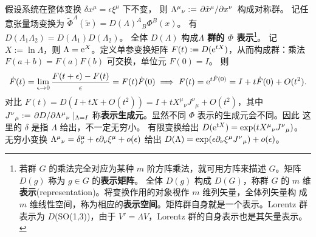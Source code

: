 假设系统在整体变换 $\delta x^\mu=\epsilon\xi^\mu$ 下不变，
则 $\Lambda^\mu{}_\nu:=\pdv*{\tilde x^\mu}{x^\nu}$ 构成对称群。
记任意张量场变换为 $\tilde\Phi^A(\tilde x) = D(\Lambda)^A{}_B\Phi^B(x)$。
有 $D(\Lambda_1\Lambda_2)=D(\Lambda_1)D(\Lambda_2)$。
全体 $D(\Lambda)$ 构成\textbf{$\Lambda$ 群的 $\Phi$ 表示}\footnote{若群 $G$ 的乘法完全对应为某种 $m$ 阶方阵乘法，就可用方阵来描述 $G$。矩阵 $D(g)$ 称为 $g\in G$ 的\textbf{表示矩阵}。
全体 $D(g)$ 构成 $D(G)$，称群 $G$ 的 $m$ 维\textbf{表示}(representation)。将变换作用的对象视作 $m$ 维列矢量，全体列矢量构
成 $m$ 维线性空间，称为相应的\textbf{表示空间}。矩阵群自身就是一个表示。Lorentz 群表示为 $D$(SO(1,3))，由于 $V'=\Lambda V$，Lorentz 群的自身表示也是其矢量表示。}。
记 $X:=\ln\Lambda$，则 $\Lambda=\mathrm{e}^X$。定义单参变换矩阵 $F(t):=D(\mathrm{e}^{tX})$，从而构成群：乘法 $F(a+b) = F(a) F(b)$ 可交换，单位元 $F(0) = I$。
则
\[
    \dot F(t) = \lim_{\epsilon\to 0}\frac{F(t+\epsilon)-F(t)}{\epsilon} = F(t) \dot F(0) \implies F(t) = \mathrm{e}^{t\dot F(0)} = I + t\dot F(0) + O(t^2).
\]
对比 $F(t) = D(I + t X + O(t^2)) = I + t X^\mu{}_\nu J^\nu{}_\mu + O(t^2)$，其中 $J^\nu{}_\mu:=\pdv*{D}{\Lambda^\mu{}_\nu}|_{\Lambda=I}$ 称\textbf{表示生成元}。显然不同 $\Phi$ 表示的生成元会不同。因此
这里的 $\delta$ 是指 $\Lambda$ 给出，不一定无穷小。
有限变换给出 $D(\mathrm{e}^{tX}) = \exp(tX^\mu{}_\nu J^\nu{}_\mu)$。
无穷小变换 $\Lambda^\mu{}_\nu = \delta^\mu_\nu + \epsilon\partial_\nu\xi^\mu + o(\epsilon)$ 给出  $D(\Lambda) = \exp(\epsilon\partial_\nu\xi^\mu J^\nu{}_\mu) + o(\epsilon)$。

